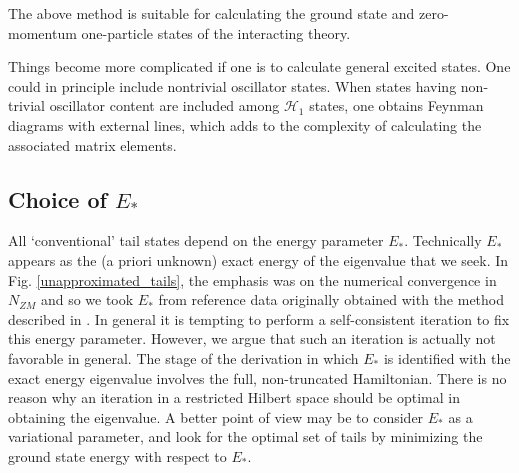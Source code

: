 \documentclass[twocolumn,secnumarabic,amssymb, nobibnotes, aps, prd]{revtex4-2}
\begin{document}
The above method is suitable for calculating the ground state and zero-momentum one-particle states
of the interacting theory. 

Things become more complicated if one is to calculate general excited
states. One could in principle include nontrivial oscillator states. When states having non-trivial oscillator content are included among $\mathcal{H}_1$ states, one obtains Feynman diagrams with external lines, which adds to the complexity of calculating the associated matrix elements. 

\subsection{Choice of $E_*$}

All `conventional' tail states depend on the energy parameter $E_*$. Technically $E_*$ appears as the (a priori unknown) exact energy of the eigenvalue that we seek. In Fig. \ref{unapproximated_tails}, the emphasis was on the numerical convergence in $N_{ZM}$ and so we took $E_*$ from reference data originally obtained with the method described in \cite{Elias-Miro:2017tup}. In general it is tempting to perform a self-consistent iteration to fix this energy parameter. However, we argue that such an iteration is actually not favorable in general. The stage of the derivation in which $E_*$ is identified with the exact energy eigenvalue involves the full, non-truncated Hamiltonian. There is no reason why an iteration in a restricted Hilbert space should be optimal in obtaining the eigenvalue. A better point of view may be to consider $E_*$ as a variational parameter, and look for the optimal set of tails by minimizing the ground state energy with respect to $E_*$. 
\end{document}
